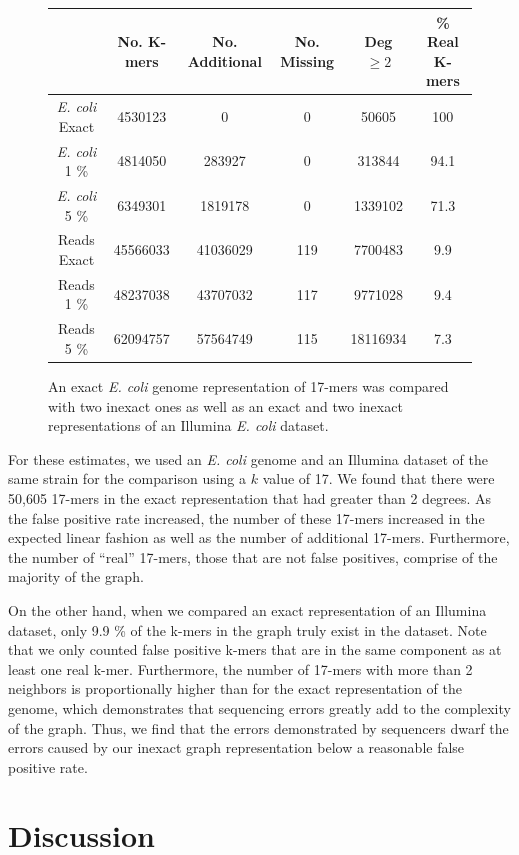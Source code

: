 \documentclass[12pt]{article} \usepackage{simplemargins}
\begin{document}
\begin{figure}
\begin{tabular}{ | c || c | c | c | c | c | }
\hline
 & No. K-mers & No. Additional & No. Missing & Deg $\ge 2$ & \% Real K-mers \\ \hline \hline
\emph{E. coli} Exact & 4530123 & 0 & 0 & 50605 & 100 \\ \hline
\emph{E. coli} 1 \% & 4814050 & 283927 & 0 & 313844 & 94.1 \\ \hline
\emph{E. coli} 5 \% & 6349301 & 1819178 & 0 & 1339102 & 71.3 \\ \hline
Reads Exact & 45566033 & 41036029 & 119 & 7700483 & 9.9 \\ \hline
Reads 1 \% & 48237038 & 43707032 & 117 & 9771028 & 9.4 \\ \hline
Reads 5 \% & 62094757 & 57564749 & 115 & 18116934 & 7.3 \\
\hline
\end{tabular}
\caption{An exact \emph{E. coli} genome representation of 17-mers was compared with 
two inexact ones as well as an exact and two inexact representations of an Illumina 
\emph{E. coli} dataset.}
\end{figure}

For these estimates, we used an \emph{E. coli} genome and an Illumina 
dataset of the same strain for the comparison using a $k$ value of 17. We found 
that there were 50,605 17-mers in the exact representation that had greater than 
2 degrees. As the false positive rate increased, the number of these 
17-mers increased in the expected linear fashion as well as the number of 
additional 17-mers. Furthermore, the number of 
``real'' 17-mers, those that are not false positives, 
comprise of the majority of the graph.

On the other hand, when we compared an exact representation of an Illumina dataset, 
only 9.9 \% of the k-mers in the graph truly exist in the dataset. Note 
that we only counted false positive k-mers that are in the same component as 
at least one real k-mer. Furthermore, the number of 17-mers with more than 
2 neighbors is proportionally higher than for the exact representation of the 
genome, which demonstrates that sequencing errors greatly add to the complexity 
of the graph. Thus, we find that the errors demonstrated by 
sequencers dwarf the errors caused by our inexact graph representation 
below a reasonable false positive rate.

\section{Discussion}
\end{document}
